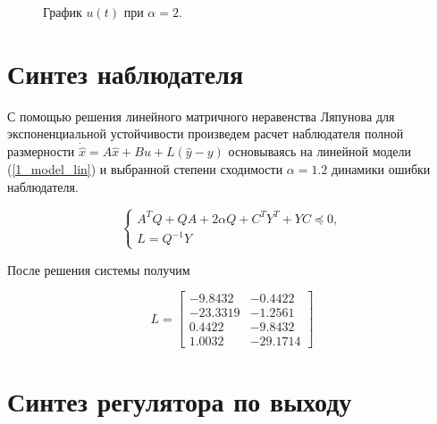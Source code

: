 \begin{figure}[!h]
	\caption{График $u(t)$ при $\alpha = 2$.}
	\label{4_4_u_2}
\end{figure}



\section{Синтез наблюдателя}
С помощью решения линейного матричного неравенства Ляпунова для экспоненциальной устойчивости произведем расчет наблюдателя полной размерности
$\dot{\hat{x}} = A\hat{x} + Bu + L(\hat{y} - y)$
основываясь на линейной модели (\ref{1_model_lin}) и выбранной степени сходимости $\alpha = 1.2$ динамики ошибки наблюдателя.

\begin{equation}
    \begin{cases}
        A^T Q +QA+2 \alpha Q + C^TY^T+YC \preceq 0,\\
        L = Q^{-1}Y
    \end{cases}
\end{equation}

После решения системы получим

\begin{equation}
    L = \begin{bmatrix}
        -9.8432	&-0.4422\\
-23.3319	&-1.2561\\
0.4422	&-9.8432\\
1.0032	&-29.1714
    \end{bmatrix}
\end{equation}




\section{Синтез регулятора по выходу}

